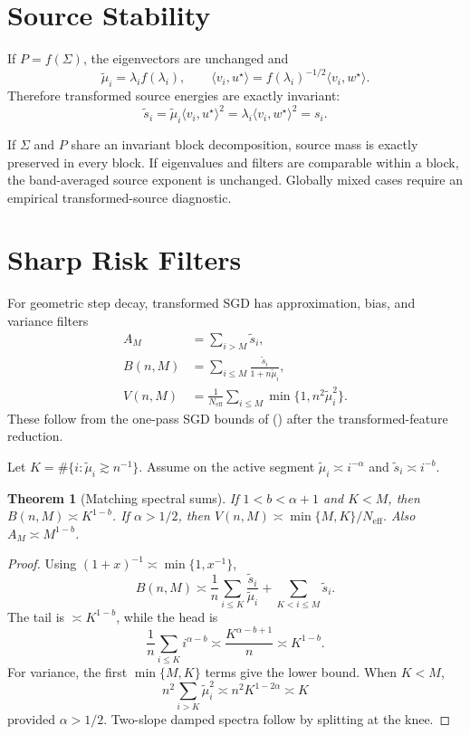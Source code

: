 \documentclass[letterpaper]{article}
\newtheorem{theorem}{Theorem}
\newcommand{\Neff}{N_{\mathrm{eff}}}
\begin{document}
\section{Source Stability}

If $P=f(\Sigma)$, the eigenvectors are unchanged and
\[
 \widetilde\mu_i=\lambda_if(\lambda_i),
 \qquad
 \langle v_i,u^\star\rangle=f(\lambda_i)^{-1/2}\langle v_i,w^\star\rangle.
\]
Therefore transformed source energies are exactly invariant:
\[
 \widetilde s_i
 =\widetilde\mu_i\langle v_i,u^\star\rangle^2
 =\lambda_i\langle v_i,w^\star\rangle^2=s_i.
\]

If $\Sigma$ and $P$ share an invariant block decomposition, source mass is exactly preserved in every block.  If eigenvalues and filters are comparable within a block, the band-averaged source exponent is unchanged.  Globally mixed cases require an empirical transformed-source diagnostic.

\section{Sharp Risk Filters}

For geometric step decay, transformed SGD has approximation, bias, and variance filters
\begin{align}
 A_M&=\sum_{i>M}\widetilde s_i,\\
 B(n,M)&=\sum_{i\le M}\frac{\widetilde s_i}{1+n\widetilde\mu_i},\\
 V(n,M)&=\frac1{\Neff}\sum_{i\le M}\min\{1,n^2\widetilde\mu_i^2\}.
\end{align}
These follow from the one-pass SGD bounds of \citeauthor{lin2024scaling} (\citeyear{lin2024scaling}) after the transformed-feature reduction.

Let $K=\#\{i:\widetilde\mu_i\gtrsim n^{-1}\}$.  Assume on the active segment $\widetilde\mu_i\asymp i^{-\alpha}$ and $\widetilde s_i\asymp i^{-b}$.

\begin{theorem}[Matching spectral sums]
If $1<b<\alpha+1$ and $K<M$, then $B(n,M)\asymp K^{1-b}$.  If $\alpha>1/2$, then $V(n,M)\asymp\min\{M,K\}/\Neff$.  Also $A_M\asymp M^{1-b}$.
\end{theorem}

\begin{proof}
Using $(1+x)^{-1}\asymp\min\{1,x^{-1}\}$,
\[
 B(n,M)\asymp
 \frac1n\sum_{i\le K}\frac{\widetilde s_i}{\widetilde\mu_i}
 +\sum_{K<i\le M}\widetilde s_i.
\]
The tail is $\asymp K^{1-b}$, while the head is
\[
 \frac1n\sum_{i\le K}i^{\alpha-b}
 \asymp\frac{K^{\alpha-b+1}}n\asymp K^{1-b}.
\]
For variance, the first $\min\{M,K\}$ terms give the lower bound.  When $K<M$,
\[
 n^2\sum_{i>K}\widetilde\mu_i^2\asymp n^2K^{1-2\alpha}\asymp K
\]
provided $\alpha>1/2$.  Two-slope damped spectra follow by splitting at the knee.
\end{proof}
\end{document}
